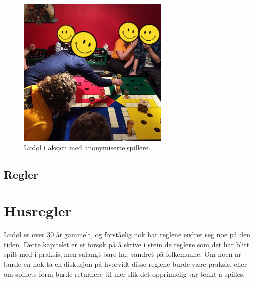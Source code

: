 \documentclass[10pt,a4paper,norsk,openany]{book}
\begin{document}
\begin{figure}[htbp!]
  \centering
  \includegraphics[width=0.65\textwidth]{ludol-live} 
  \caption{Ludøl i aksjon med anonymiserte spillere.}
  \label{fig:ludol-live}
\end{figure}

\newpage

\section{Regler} 




\chapter{Husregler}

Ludøl er over 30 år gammelt, og forståelig nok har reglene endret seg noe på den
tiden. Dette kapitelet er et forsøk på å skrive i stein de reglene som det har
blitt spilt med i praksis, men sålangt bare har vandret på folkemunne. Om noen
år burde en nok ta en diskusjon på hvorvidt disse reglene burde være praksis,
eller om spillets form burde returnere til mer slik det opprinnelig var tenkt å
spilles.
\end{document}
